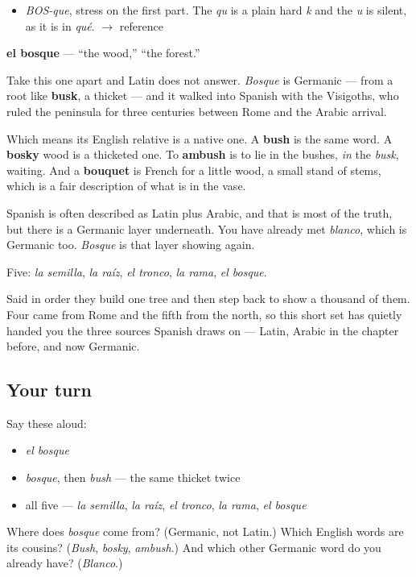 \begin{sounds}
\begin{itemize}
\raggedright
  \item \emph{BOS-que}, stress on the first part. The \emph{qu} is a plain hard \emph{k} and the \emph{u} is silent, as it is in \emph{qué}. $\to$ reference
\end{itemize}
\end{sounds}

\begin{cousinweb}
\textbf{el bosque} — \textquotedblleft{}the wood,\textquotedblright{} \textquotedblleft{}the forest.\textquotedblright{}

Take this one apart and Latin does not answer. \emph{Bosque} is Germanic — from a root like \textbf{busk}, a thicket — and it walked into Spanish with the Visigoths, who ruled the peninsula for three centuries between Rome and the Arabic arrival.

Which means its English relative is a native one. A \textbf{bush} is the same word. A \textbf{bosky} wood is a thicketed one. To \textbf{ambush} is to lie in the bushes, \emph{in} the \emph{busk}, waiting. And a \textbf{bouquet} is French for a little wood, a small stand of stems, which is a fair description of what is in the vase.

Spanish is often described as Latin plus Arabic, and that is most of the truth, but there is a Germanic layer underneath. You have already met \emph{blanco}, which is Germanic too. \emph{Bosque} is that layer showing again.
\end{cousinweb}

\begin{grammarlens}[title={What you've built}]
Five: \emph{la semilla}, \emph{la raíz}, \emph{el tronco}, \emph{la rama}, \emph{el bosque}.

Said in order they build one tree and then step back to show a thousand of them. Four came from Rome and the fifth from the north, so this short set has quietly handed you the three sources Spanish draws on — Latin, Arabic in the chapter before, and now Germanic.
\end{grammarlens}

\subsection*{Your turn}
Say these aloud:

\begin{itemize}
\raggedright
  \item \emph{el bosque}
  \item \emph{bosque}, then \emph{bush} — the same thicket twice
  \item all five — \emph{la semilla}, \emph{la raíz}, \emph{el tronco}, \emph{la rama}, \emph{el bosque}
\end{itemize}

\begin{tcolorbox}[breakable,colback=teal!4,colframe=teal!35!black,title={Before you move on}]
Where does \emph{bosque} come from? (Germanic, not Latin.) Which English words are its cousins? (\emph{Bush}, \emph{bosky}, \emph{ambush}.) And which other Germanic word do you already have? (\emph{Blanco}.)
\end{tcolorbox}
